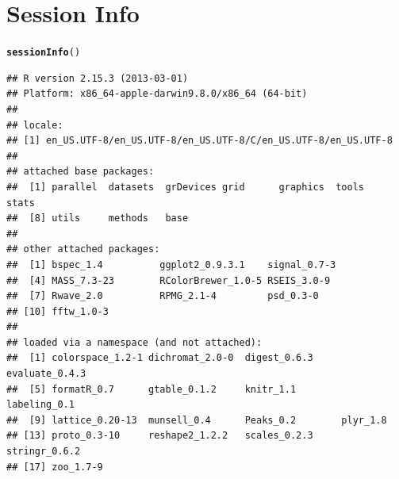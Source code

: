 \documentclass{article}\usepackage{graphicx, color}
\makeatletter
\newcommand{\hlfunctioncall}[1]{\textcolor[rgb]{0.501960784313725,0,0.329411764705882}{\textbf{#1}}}%
\newenvironment{kframe}{%
 \def\at@end@of@kframe{}%
 \ifinner\ifhmode%
  \def\at@end@of@kframe{\end{minipage}}%
  \begin{minipage}{\columnwidth}%
 \fi\fi%
 \def\FrameCommand##1{\hskip\@totalleftmargin \hskip-\fboxsep
 \colorbox{shadecolor}{##1}\hskip-\fboxsep
     \hskip-\linewidth \hskip-\@totalleftmargin \hskip\columnwidth}%
 \MakeFramed {\advance\hsize-\width
   \@totalleftmargin\z@ \linewidth\hsize
   \@setminipage}}%
 {\par\unskip\endMakeFramed%
 \at@end@of@kframe}
\newenvironment{knitrout}{}{} %
\makeatother
\begin{document}
\section*{Session Info}
\begin{knitrout}
\color{fgcolor}\begin{kframe}
\begin{alltt}
\hlfunctioncall{sessionInfo}()
\end{alltt}
\begin{verbatim}
## R version 2.15.3 (2013-03-01)
## Platform: x86_64-apple-darwin9.8.0/x86_64 (64-bit)
## 
## locale:
## [1] en_US.UTF-8/en_US.UTF-8/en_US.UTF-8/C/en_US.UTF-8/en_US.UTF-8
## 
## attached base packages:
##  [1] parallel  datasets  grDevices grid      graphics  tools     stats    
##  [8] utils     methods   base     
## 
## other attached packages:
##  [1] bspec_1.4          ggplot2_0.9.3.1    signal_0.7-3      
##  [4] MASS_7.3-23        RColorBrewer_1.0-5 RSEIS_3.0-9       
##  [7] Rwave_2.0          RPMG_2.1-4         psd_0.3-0         
## [10] fftw_1.0-3        
## 
## loaded via a namespace (and not attached):
##  [1] colorspace_1.2-1 dichromat_2.0-0  digest_0.6.3     evaluate_0.4.3  
##  [5] formatR_0.7      gtable_0.1.2     knitr_1.1        labeling_0.1    
##  [9] lattice_0.20-13  munsell_0.4      Peaks_0.2        plyr_1.8        
## [13] proto_0.3-10     reshape2_1.2.2   scales_0.2.3     stringr_0.6.2   
## [17] zoo_1.7-9
\end{verbatim}
\end{kframe}
\end{knitrout}



\end{document}
